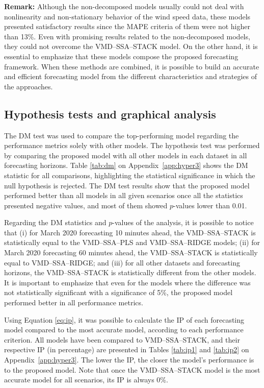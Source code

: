 \textbf{Remark:} Although the non-decomposed models usually could not deal with nonlinearity and non-stationary behavior of the wind speed data, these models presented satisfactory results since the \ac{MAPE} criteria of them were not higher than 13\%. Even with promising results related to the non-decomposed models, they could not overcome the \ac{VMD}--\ac{SSA}--\ac{STACK} model. On the other hand, it is essential to emphasize that these models compose the proposed forecasting framework. When these methods are combined, it is possible to build an accurate and efficient forecasting model from the different characteristics and strategies of the approaches.

\subsection{Hypothesis tests and graphical analysis \label{subsec:hypothesis}}

The \ac{DM} test was used to compare the top-performing model regarding the performance metrics solely with other models. The hypothesis test was performed by comparing the proposed model with all other models in each dataset in all forecasting horizons. Table \ref{tab:dm} on Appendix~\ref{app:hyper3} shows the \ac{DM} statistic for all comparisons, highlighting the statistical significance in which the null hypothesis is rejected. The \ac{DM} test results show that the proposed model performed better than all models in all given scenarios once all the statistics presented negative values, and most of them showed $p$-values lower than 0.01.

Regarding the \ac{DM} statistics and $p$-values of the analysis, it is possible to notice that (i) for March 2020 forecasting 10 minutes ahead, the \ac{VMD}--\ac{SSA}--\ac{STACK} is statistically equal to the \ac{VMD}--\ac{SSA}--\ac{PLS} and \ac{VMD}--\ac{SSA}--\ac{RIDGE} models; (ii) for March 2020 forecasting 60 minutes ahead, the \ac{VMD}--\ac{SSA}--\ac{STACK} is statistically equal to \ac{VMD}--\ac{SSA}--\ac{RIDGE}; and (iii) for all other datasets and forecasting horizons, the \ac{VMD}--\ac{SSA}--\ac{STACK} is statistically different from the other models. It is important to emphasize that even for the models where the difference was not statistically significant with a significance of 5\%, the proposed model performed better in all performance metrics.

Using Equation \eqref{eq:ip}, it was possible to calculate the \ac{IP} of each forecasting model compared to the most accurate model, according to each performance criterion. All models have been compared to \ac{VMD}--\ac{SSA}--\ac{STACK}, and their respective \ac{IP} (in percentage) are presented in Tables \ref{tab:ip1} and \ref{tab:ip2} on Appendix~\ref{app:hyper3}. The lower the \ac{IP}, the closer the model's performance is to the proposed model. Note that once the \ac{VMD}--\ac{SSA}--\ac{STACK} model is the most accurate model for all scenarios, its \ac{IP} is always 0\%. 

